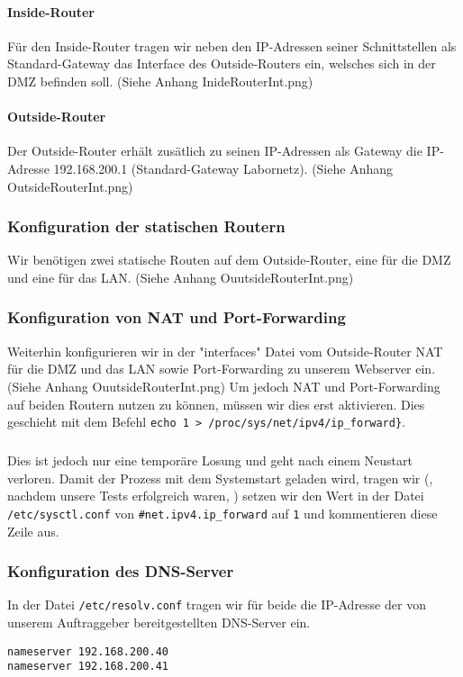 \paragraph*{Inside-Router} Für den Inside-Router tragen wir neben den IP-Adressen seiner Schnittstellen als Standard-Gateway das Interface des Outside-Routers ein, welsches sich in der DMZ befinden soll. (Siehe Anhang InideRouterInt.png)

\paragraph*{Outside-Router} Der Outside-Router erhält zusätlich zu seinen IP-Adressen als Gateway die IP-Adresse 192.168.200.1 (Standard-Gateway Labornetz). (Siehe Anhang OutsideRouterInt.png)

\subsubsection{Konfiguration der statischen Routern}
\label{subsubsec:KonfigurationStatischeRouten}
Wir benötigen zwei statische Routen auf dem Outside-Router, eine für die DMZ und eine für das LAN. (Siehe Anhang OuutsideRouterInt.png)

\subsubsection{Konfiguration von NAT und Port-Forwarding}
\label{subsubsec:KonfigurationNAT}
Weiterhin konfigurieren wir in der "interfaces" Datei vom Outside-Router NAT für die DMZ und das LAN sowie Port-Forwarding zu unserem Webserver ein. (Siehe Anhang OuutsideRouterInt.png)
Um jedoch NAT und Port-Forwarding auf beiden Routern nutzen zu können, müssen wir dies erst aktivieren. Dies geschieht mit dem Befehl
\verb+echo 1 > /proc/sys/net/ipv4/ip_forward}+.

\subparagraph*{}  Dies ist jedoch nur eine temporäre Losung und geht nach einem Neustart verloren. Damit der Prozess mit dem Systemstart geladen wird, tragen wir (, nachdem unsere Tests erfolgreich waren, ) setzen wir den Wert in der Datei \texttt{/etc/sysctl.conf} von  \verb+#net.ipv4.ip_forward+ auf \verb+1+ und kommentieren diese Zeile aus.

\subsubsection{Konfiguration des DNS-Server}
\label{subsubsec:KonfigurationDNS}
In der Datei \verb+/etc/resolv.conf+ tragen wir für beide die IP-Adresse der von unserem Auftraggeber bereitgestellten DNS-Server ein.
\begin{verbatim}
nameserver 192.168.200.40
nameserver 192.168.200.41
\end{verbatim}

